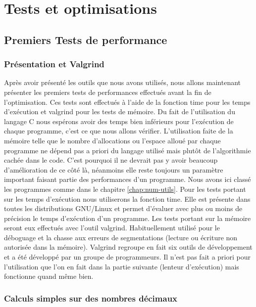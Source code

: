 
\chapter{Tests et optimisations}
\label{chap:tests et optimisations}

\section{Premiers Tests de performance}

\subsection{Pr\'esentation et Valgrind}
Apr\`es avoir pr\'esent\'e les outils que nous avons utilis\'es, nous allons maintenant pr\'esenter les premiers tests de performances effectu\'es 
avant la fin de l'optimisation.
Ces tests sont effectu\'es \`a l'aide de la fonction time pour les temps d'ex\'ecution et valgrind \citep{valgrind} pour les tests de m\'emoire.
Du fait de l'utilisation du langage C nous esp\'erons avoir des temps bien inf\'erieurs pour l'ex\'ecution de chaque programme, c'est ce que nous allons
 v\'erifier.
L'utilisation faite de la m\'emoire telle que le nombre d'allocations ou l'espace allou\'e par chaque programme ne d\'epend pas a priori du langage
 utilis\'e mais plut\^ot de l'algorithmie cach\'ee dans le code. C'est pourquoi il ne devrait pas y avoir beaucoup d'am\'elioration de ce c\^ot\'e l\`a,
n\'eanmoins elle reste toujours un param\`etre important faisant partie des performances d'un programme.
Nous avons ici class\'e les programmes comme dans le chapitre \ref{chap:num-utils}.
Pour les tests portant sur les temps d'ex\'ecution nous utiliserons la fonction time. Elle est pr\'esente dans toutes les distributions GNU/Linux et permet d'\'evaluer avec plus ou moins de pr\'ecision le temps d'ex\'ecution d'un programme.
Les tests portant sur la m\'emoire seront eux effectu\'es avec l'outil valgrind. Habituellement utilis\'e pour le d\'eboguage et la chasse aux erreurs de segmentations (lecture ou \'ecriture non autoris\'ee dans la m\'emoire).
Valgrind regroupe en fait six outils de d\'eveloppement et a \'et\'e d\'evelopp\'e par un groupe de programmeurs. Il n'est pas fait a priori pour l'utilisation que l'on en fait dans la partie suivante (lenteur d'ex\'ecution) mais fonctionne quand m\^eme bien.
 

\subsection{Calculs simples sur des nombres d\'ecimaux}

